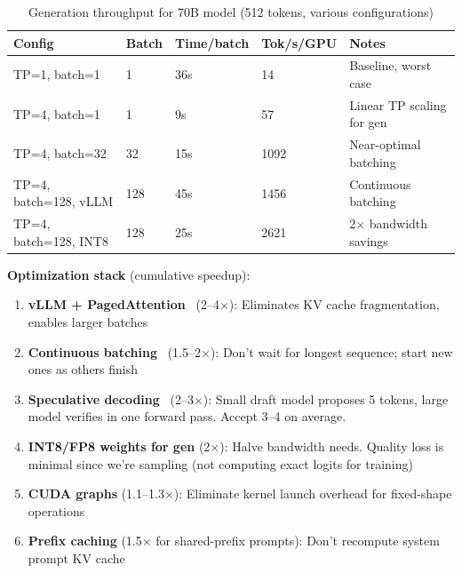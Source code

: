 \begin{table}[ht!]
\centering
\caption{Generation throughput for 70B model (512 tokens, various configurations)}
{\footnotesize
\begin{tabular}{@{}lllll@{}}
\toprule
\textbf{Config} & \textbf{Batch} & \textbf{Time/batch} & \textbf{Tok/s/GPU} & \textbf{Notes} \\
\midrule
TP=1, batch=1 & 1 & 36s & 14 & Baseline, worst case \\
TP=4, batch=1 & 1 & 9s & 57 & Linear TP scaling for gen \\
TP=4, batch=32 & 32 & 15s & 1092 & Near-optimal batching \\
TP=4, batch=128, vLLM & 128 & 45s & 1456 & Continuous batching \\
TP=4, batch=128, INT8 & 128 & 25s & 2621 & 2$\times$ bandwidth savings \\
\bottomrule
\end{tabular}
}
\end{table}

\textbf{Optimization stack} (cumulative speedup):

\begin{enumerate}
  \item \textbf{vLLM + PagedAttention}~\cite{kwon2023efficient} (2--4$\times$): Eliminates KV cache fragmentation, enables larger batches
  \item \textbf{Continuous batching}~\cite{yu2022orca} (1.5--2$\times$): Don’t wait for longest sequence; start new ones as others finish
  \item \textbf{Speculative decoding}~\cite{leviathan2023fast} (2--3$\times$): Small draft model proposes 5 tokens, large model verifies in one forward pass. Accept 3--4 on average.
  \item \textbf{INT8/FP8 weights for gen} (2$\times$): Halve bandwidth needs. Quality loss is minimal since we’re sampling (not computing exact logits for training)
  \item \textbf{CUDA graphs} (1.1--1.3$\times$): Eliminate kernel launch overhead for fixed-shape operations
  \item \textbf{Prefix caching} (1.5$\times$ for shared-prefix prompts): Don’t recompute system prompt KV cache
\end{enumerate}

